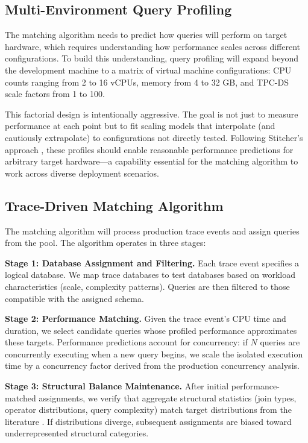 \documentclass[12pt]{report}
\begin{document}
\subsection{Multi-Environment Query Profiling}
\label{subsec:multi-profiling}

The matching algorithm needs to predict how queries will perform on target hardware, which requires understanding how performance scales across different configurations. To build this understanding, query profiling will expand beyond the development machine to a matrix of virtual machine configurations: CPU counts ranging from 2 to 16 vCPUs, memory from 4 to 32 GB, and TPC-DS scale factors from 1 to 100.

This factorial design is intentionally aggressive. The goal is not just to measure performance at each point but to fit scaling models that interpolate (and cautiously extrapolate) to configurations not directly tested. Following Stitcher's approach \cite{stitcher}, these profiles should enable reasonable performance predictions for arbitrary target hardware---a capability essential for the matching algorithm to work across diverse deployment scenarios.

\subsection{Trace-Driven Matching Algorithm}
\label{subsec:matching-algorithm}

The matching algorithm will process production trace events and assign queries from the pool. The algorithm operates in three stages:

\textbf{Stage 1: Database Assignment and Filtering.} Each trace event specifies a logical database. We map trace databases to test databases based on workload characteristics (scale, complexity patterns). Queries are then filtered to those compatible with the assigned schema.

\textbf{Stage 2: Performance Matching.} Given the trace event's CPU time and duration, we select candidate queries whose profiled performance approximates these targets. Performance predictions account for concurrency: if $N$ queries are concurrently executing when a new query begins, we scale the isolated execution time by a concurrency factor derived from the production concurrency analysis.

\textbf{Stage 3: Structural Balance Maintenance.} After initial performance-matched assignments, we verify that aggregate structural statistics (join types, operator distributions, query complexity) match target distributions from the literature \cite{snowset, pbench}. If distributions diverge, subsequent assignments are biased toward underrepresented structural categories.
\end{document}

